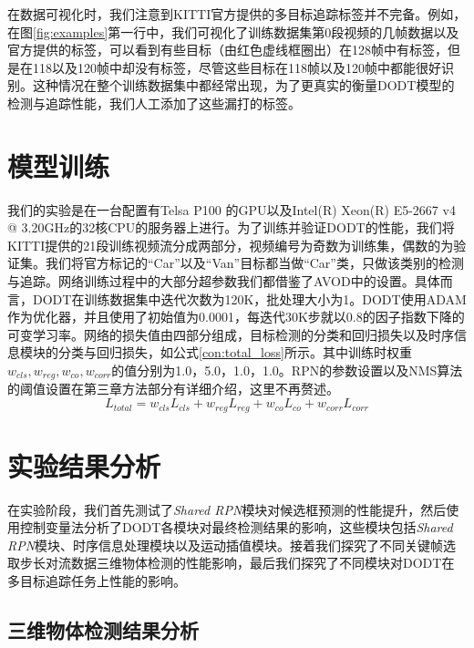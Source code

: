 

在数据可视化时，我们注意到KITTI官方提供的多目标追踪标签并不完备。例如，在图\ref{fig:examples}第一行中，我们可视化了训练数据集第0段视频的几帧数据以及官方提供的标签，可以看到有些目标（由红色虚线框圈出）在128帧中有标签，但是在118以及120帧中却没有标签，尽管这些目标在118帧以及120帧中都能很好识别。这种情况在整个训练数据集中都经常出现，为了更真实的衡量DODT模型的检测与追踪性能，我们人工添加了这些漏打的标签。

\section{模型训练}
\label{training}
我们的实验是在一台配置有Telsa P100 的GPU以及Intel(R) Xeon(R) E5-2667 v4 @ 3.20GHz的32核CPU的服务器上进行。为了训练并验证DODT的性能，我们将KITTI提供的21段训练视频流分成两部分，视频编号为奇数为训练集，偶数的为验证集。我们将官方标记的“Car”以及“Van”目标都当做“Car”类，只做该类别的检测与追踪。网络训练过程中的大部分超参数我们都借鉴了AVOD\cite{ku2018joint}中的设置。具体而言，DODT在训练数据集中迭代次数为120K，批处理大小为1。DODT使用ADAM\cite{kingma2014adam}作为优化器，并且使用了初始值为0.0001，每迭代30K步就以0.8的因子指数下降的可变学习率。网络的损失值由四部分组成，目标检测的分类和回归损失以及时序信息模块的分类与回归损失，如公式\ref{con:total_loss}所示。其中训练时权重$w_{cls}, w_{reg}, w_{co}, w_{corr}$的值分别为1.0，5.0，1.0，1.0。RPN的参数设置以及NMS算法的阈值设置在第三章方法部分有详细介绍，这里不再赘述。
\begin{equation}
L_{total} = w_{cls}L_{cls} + w_{reg}L_{reg} + w_{co}L_{co} + w_{corr}L_{corr}
\label{con:total_loss}
\end{equation}

\section{实验结果分析}
\label{results}

在实验阶段，我们首先测试了\textit{Shared RPN}模块对候选框预测的性能提升，然后使用控制变量法分析了DODT各模块对最终检测结果的影响，这些模块包括\textit{Shared RPN}模块、时序信息处理模块以及运动插值模块。接着我们探究了不同关键帧选取步长对流数据三维物体检测的性能影响，最后我们探究了不同模块对DODT在多目标追踪任务上性能的影响。

\subsection{三维物体检测结果分析}
\label{ablation_study}

